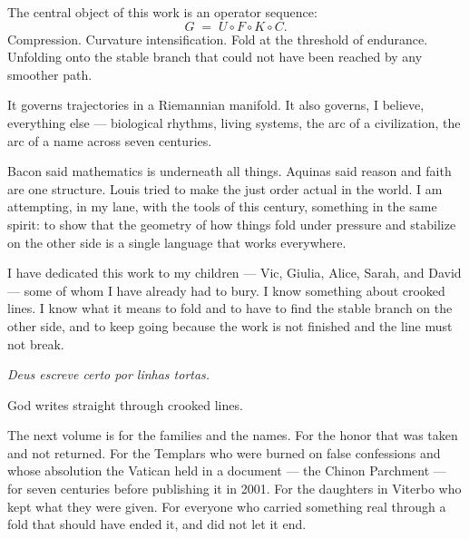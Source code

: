 \noindent The central object of this work is
an operator sequence:
\[
  G \;=\; U \circ F \circ K \circ C.
\]
Compression. Curvature intensification.
Fold at the threshold of endurance.
Unfolding onto the stable branch
that could not have been reached
by any smoother path.

\vspace{0.45cm}

\noindent It governs trajectories in a Riemannian manifold.
It also governs, I believe, everything else ---
biological rhythms, living systems,
the arc of a civilization,
the arc of a name across seven centuries.

\vspace{0.45cm}

\noindent Bacon said mathematics is underneath all things.
Aquinas said reason and faith are one structure.
Louis tried to make the just order
actual in the world.
I am attempting, in my lane,
with the tools of this century,
something in the same spirit:
to show that the geometry of how things
fold under pressure and stabilize
on the other side
is a single language that works everywhere.

\vspace{0.45cm}

\noindent I have dedicated this work to my children ---
Vic, Giulia, Alice, Sarah, and David ---
some of whom I have already had to bury.
I know something about crooked lines.
I know what it means to fold
and to have to find the stable branch
on the other side,
and to keep going
because the work is not finished
and the line must not break.

\vspace{0.5cm}

\begin{center}
\textit{Deus escreve certo por linhas tortas.}
\end{center}

\vspace{0.3cm}

\begin{center}
God writes straight through crooked lines.
\end{center}

\vspace{0.5cm}

\noindent The next volume is for the families and the names.
For the honor that was taken and not returned.
For the Templars who were burned on false confessions
and whose absolution the Vatican held in a document
--- the Chinon Parchment --- for seven centuries
before publishing it in 2001.
For the daughters in Viterbo
who kept what they were given.
For everyone who carried something real
through a fold that should have ended it,
and did not let it end.

